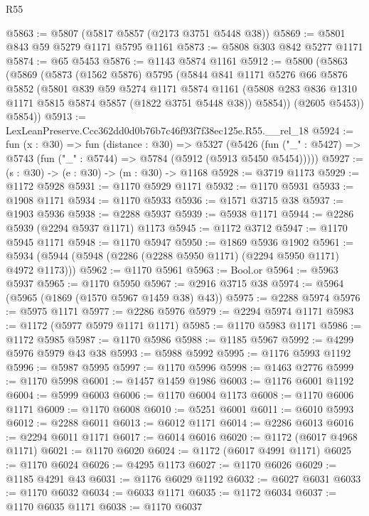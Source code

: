 \begin{lexlean}{R55}
\begin{coremodule}
@5863 := @5807 (@5817 @5857 (@2173 @3751 @5448 @38))
@5869 := @5801 @843 @59 @5279 @1171 @5795 @1161
@5873 := @5808 @303 @842 @5277 @1171
@5874 := @65 @5453
@5876 := @1143 @5874 @1161
@5912 := @5800
    (@5863
      (@5869
        (@5873
          (@1562 @5876)
          @5795
          (@5844
            @841
            @1171
            @5276
            @66
            @5876
            @5852
            (@5801
              @839
              @59
              @5274
              @1171
              @5874
              @1161
              (@5808 @283 @836 @1310 @1171 @5815 @5874 @5857 (@1822 @3751 @5448 @38))
              @5854))
          (@2605 @5453))
        @5854))
@5913 := LexLeanPreserve.Ccc362dd0d0b76b7c46f93f7f38ec125e.R55.__rel_18
@5924 := fun (x : @30) =>
  fun (distance : @30) =>
  @5327
    (@5426 (fun ("_" : @5427) => @5743 (fun ("_" : @5744) => @5784 (@5912 (@5913 @5450 @5454)))))
@5927 := (s : @30) -> (e : @30) -> (m : @30) -> @1168
@5928 := @3719 @1173
@5929 := @1172 @5928
@5931 := @1170 @5929 @1171
@5932 := @1170 @5931
@5933 := @1908 @1171
@5934 := @1170 @5933
@5936 := @1571 @3715 @38
@5937 := @1903 @5936
@5938 := @2288 @5937
@5939 := @5938 @1171
@5944 := @2286 @5939 (@2294 @5937 @1171) @1173
@5945 := @1172 @3712
@5947 := @1170 @5945 @1171
@5948 := @1170 @5947
@5950 := @1869 @5936 @1902
@5961 := @5934 (@5944 (@5948 (@2286 (@2288 @5950 @1171) (@2294 @5950 @1171) @4972 @1173)))
@5962 := @1170 @5961
@5963 := Bool.or
@5964 := @5963 @5937
@5965 := @1170 @5950
@5967 := @2916 @3715 @38
@5974 := @5964 (@5965 (@1869 (@1570 @5967 @1459 @38) @43))
@5975 := @2288 @5974
@5976 := @5975 @1171
@5977 := @2286 @5976
@5979 := @2294 @5974 @1171
@5983 := @1172 (@5977 @5979 @1171 @1171)
@5985 := @1170 @5983 @1171
@5986 := @1172 @5985
@5987 := @1170 @5986
@5988 := @1185 @5967
@5992 := @4299 @5976 @5979 @43 @38
@5993 := @5988 @5992
@5995 := @1176 @5993 @1192
@5996 := @5987 @5995
@5997 := @1170 @5996
@5998 := @1463 @2776
@5999 := @1170 @5998
@6001 := @1457 @1459 @1986
@6003 := @1176 @6001 @1192
@6004 := @5999 @6003
@6006 := @1170 @6004 @1173
@6008 := @1170 @6006 @1171
@6009 := @1170 @6008
@6010 := @5251 @6001
@6011 := @6010 @5993
@6012 := @2288 @6011
@6013 := @6012 @1171
@6014 := @2286 @6013
@6016 := @2294 @6011 @1171
@6017 := @6014 @6016
@6020 := @1172 (@6017 @4968 @1171)
@6021 := @1170 @6020
@6024 := @1172 (@6017 @4991 @1171)
@6025 := @1170 @6024
@6026 := @4295 @1173
@6027 := @1170 @6026
@6029 := @1185 @4291 @43
@6031 := @1176 @6029 @1192
@6032 := @6027 @6031
@6033 := @1170 @6032
@6034 := @6033 @1171
@6035 := @1172 @6034
@6037 := @1170 @6035 @1171
@6038 := @1170 @6037

\end{coremodule}
\end{lexlean}
